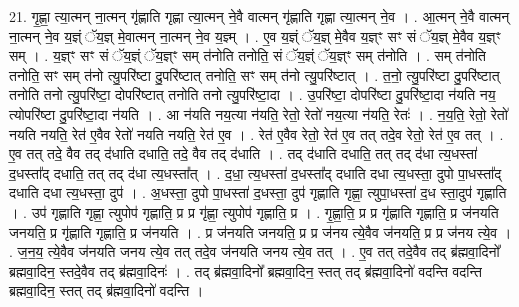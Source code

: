 \documentclass[17pt]{extarticle}
\begin{document}
21. गृ॒ह्णा॒ त्या॒त्मन् ना॒त्मन् गृ॑ह्णाति गृह्णा त्या॒त्मन् ने॒वै वात्मन् गृ॑ह्णाति गृह्णा त्या॒त्मन् ने॒व । . आ॒त्मन् ने॒वै वात्मन् ना॒त्मन् ने॒व य॒ज्ञ्ं ॅय॒ज्ञ् मे॒वात्मन् ना॒त्मन् ने॒व य॒ज्ञ्म् । . ए॒व य॒ज्ञ्ं ॅय॒ज्ञ् मे॒वैव य॒ज्ञ्ꣳ सꣳ सं ॅय॒ज्ञ् मे॒वैव य॒ज्ञ्ꣳ सम् । . य॒ज्ञ्ꣳ सꣳ सं ॅय॒ज्ञ्ं ॅय॒ज्ञ्ꣳ सम् त॑नोति तनोति॒ सं ॅय॒ज्ञ्ं ॅय॒ज्ञ्ꣳ सम् त॑नोति । . सम् त॑नोति तनोति॒ सꣳ सम् त॑नो त्यु॒परि॑ष्टा दु॒परि॑ष्टात् तनोति॒ सꣳ सम् त॑नो त्यु॒परि॑ष्टात् । . त॒नो॒ त्यु॒परि॑ष्टा दु॒परि॑ष्टात् तनोति तनो त्यु॒परि॑ष्टा॒ दोपरि॑ष्टात् तनोति तनो त्यु॒परि॑ष्टा॒दा । . उ॒परि॑ष्टा॒ दोपरि॑ष्टा दु॒परि॑ष्टा॒दा न॑यति नय॒ त्योपरि॑ष्टा दु॒परि॑ष्टा॒दा न॑यति । . आ न॑यति नय॒त्या न॑यति॒ रेतो॒ रेतो॑ नय॒त्या न॑यति॒ रेतः॑ । . न॒य॒ति॒ रेतो॒ रेतो॑ नयति नयति॒ रेत॑ ए॒वैव रेतो॑ नयति नयति॒ रेत॑ ए॒व । . रेत॑ ए॒वैव रेतो॒ रेत॑ ए॒व तत् तदे॒व रेतो॒ रेत॑ ए॒व तत् । . ए॒व तत् तदे॒ वैव तद् द॑धाति दधाति॒ तदे॒ वैव तद् द॑धाति । . तद् द॑धाति दधाति॒ तत् तद् द॑धा त्य॒धस्ता॑ द॒धस्ता᳚द् दधाति॒ तत् तद् द॑धा त्य॒धस्ता᳚त् । . द॒धा॒ त्य॒धस्ता॑ द॒धस्ता᳚द् दधाति दधा त्य॒धस्ता॒ दुपो पा॒धस्ता᳚द् दधाति दधा त्य॒धस्ता॒ दुप॑ । . अ॒धस्ता॒ दुपो पा॒धस्ता॑ द॒धस्ता॒ दुप॑ गृह्णाति गृह्णा॒ त्युपा॒धस्ता॑ द॒ध स्ता॒दुप॑ गृह्णाति । . उप॑ गृह्णाति गृह्णा॒ त्युपोप॑ गृह्णाति॒ प्र प्र गृ॑ह्णा॒ त्युपोप॑ गृह्णाति॒ प्र । . गृ॒ह्णा॒ति॒ प्र प्र गृ॑ह्णाति गृह्णाति॒ प्र ज॑नयति जनयति॒ प्र गृ॑ह्णाति गृह्णाति॒ प्र ज॑नयति । . प्र ज॑नयति जनयति॒ प्र प्र ज॑नय त्ये॒वैव ज॑नयति॒ प्र प्र ज॑नय त्ये॒व । . ज॒न॒य॒ त्ये॒वैव ज॑नयति जनय त्ये॒व तत् तदे॒व ज॑नयति जनय त्ये॒व तत् । . ए॒व तत् तदे॒वैव तद् ब्र॑ह्मवा॒दिनो᳚ ब्रह्मवा॒दिन॒ स्तदे॒वैव तद् ब्र॑ह्मवा॒दिनः॑ । . तद् ब्र॑ह्मवा॒दिनो᳚ ब्रह्मवा॒दिन॒ स्तत् तद् ब्र॑ह्मवा॒दिनो॑ वदन्ति वदन्ति ब्रह्मवा॒दिन॒ स्तत् तद् ब्र॑ह्मवा॒दिनो॑ वदन्ति । \newline
\end{document}
